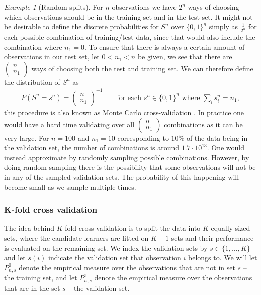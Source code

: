 \documentclass[11pt, a4paper]{article}
\theoremstyle{definition}
\theoremstyle{remark}
\newtheorem{example}{Example}
\newcommand{\Sn}{S^n}
\begin{document}
\begin{example}[Random splits] \label{splits}
   For $ n $ observations we have $ 2^{n} $ ways of choosing which observations should be in the training set and in the test set. It might not be desirable to define the discrete probabilities for $ \Sn $ over $ \{0,1\}^{n} $ simply as $ \frac{1}{2^{n}} $ for each possible combination of training/test data, since that would also include the combination where $ n_1 = 0 $. To ensure that there is always a certain amount of observations in our test set, let $ 0 < n_1 < n $ be given, we see that there are $ \begin{pmatrix}
        n \\ n_1
    \end{pmatrix}$ ways of choosing both the test and training set. We can therefore define the distribution of $ \Sn $ as 
    \begin{align*}
        P \left(\Sn = s^n \right) = \begin{pmatrix}
            n \\ n_1
    \end{pmatrix}^{-1} \qquad \text{for each } s^n \in \{0,1\}^{n} \text{ where } \sum_{i} s^n_i = n_1,
    \end{align*}
    this procedure is also known as Monte Carlo cross-validation \parencite{laan03}. In practice one would have a hard time validating over all $ \begin{pmatrix} n \\ n_1\end{pmatrix} $ combinations as it can be very large. For $ n = 100 $ and $ n_1 = 10 $ corresponding to $ 10\% $ of the data being in the validation set, the number of combinations is around $ 1.7 \cdot 10^{13} $. One would instead approximate by randomly sampling possible combinations. However, by doing random sampling there is the possibility that some observations will not be in any of the sampled validation sets. The probability of this happening will become small as we sample multiple times.  
\end{example}
\subsubsection{K-fold cross validation}
The idea behind $ K $-fold cross-validation is to split the data into $ K $ equally sized sets, where the candidate learners are fitted on $ K - 1 $ sets and their performance is evaluated on the remaining set. We index the validation sets by $ s \in \{1, \dots , K\} $ and let $ s(i) $ indicate the validation set that observation $ i $ belongs to. We will let $ P_{n, s}^{0} $ denote the empirical measure over the observations that are not in set $ s $ -- the training set, and let $ P_{n, s}^{1} $ denote the empirical measure over the observations that are in the set $ s $ -- the validation set. 
\end{document}
